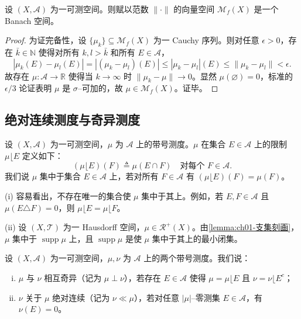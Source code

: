 \documentclass[../../main.tex]{subfiles}%
\begin{document}
\begin{proposition}\label{proposition:ch01-Banach完备}
设 $(X,\mathcal{A})$ 为一可测空间。则赋以范数 $\|\cdot\|$ 的向量空间 $\mathcal{M}_f(X)$ 是一个 Banach 空间。
\end{proposition}

\begin{proof}
为证完备性，设 $\{\mu_k\}\subseteq\mathcal{M}_f(X)$ 为一 Cauchy 序列。则对任意 $\epsilon>0$，存在 $\bar{k}\in\mathbb{N}$ 使得对所有 $k,l>\bar{k}$ 和所有 $E\in\mathcal{A}$，
\[
|\mu_k(E)-\mu_l(E)|=|(\mu_k-\mu_l)(E)|\leqslant|\mu_k-\mu_l|(E)\leqslant\|\mu_k-\mu_l\|<\epsilon.
\]
故存在 $\mu:\mathcal{A}\to\mathbb{R}$ 使得当 $k\to\infty$ 时 $\|\mu_k-\mu\|\to 0$。显然 $\mu(\varnothing )=0$，标准的 $\epsilon/3$ 论证表明 $\mu$ 是 $\sigma$--可加的，故 $\mu\in\mathcal{M}_f(X)$。证毕。
\end{proof}

\subsection{绝对连续测度与奇异测度}\label{subsection:ch01-绝对连续奇异}

\begin{definition}\label{definition:ch01-集中测度}
设 $(X,\mathcal{A})$ 为一可测空间，$\mu$ 为 $\mathcal{A}$ 上的带号测度。$\mu$ 在集合 $E\in\mathcal{A}$ 上的限制 $\mu\lfloor E$ 定义如下：
\[
(\mu\lfloor E)(F)\triangleq \mu(E\cap F)\quad\text{对每个 }F\in\mathcal{A}.
\]
我们说 $\mu$ 集中于集合 $E\in\mathcal{A}$ 上，若对所有 $F\in\mathcal{A}$ 有 $(\mu\lfloor E)(F)=\mu(F)$。
\end{definition}

\begin{remark}\label{remark:ch01-集中注记}
(i) 容易看出，不存在唯一的集合使 $\mu$ 集中于其上。例如，若 $E,F\in\mathcal{A}$ 且 $\mu(E\triangle F)=0$，则 $\mu\lfloor E=\mu\lfloor F$。

(ii) 设 $(X,\mathcal{T})$ 为一 Hausdorff 空间，$\mu\in\mathcal{R}^+(X)$。由\cref{lemma:ch01-支集刻画}，$\mu$ 集中于 $\operatorname{supp}\mu$ 上，且 $\operatorname{supp}\mu$ 是使 $\mu$ 集中于其上的最小闭集。
\end{remark}

\begin{definition}\label{definition:ch01-相互奇异绝对连续}\label{definition:ch01-测度绝对连续}
设 $(X,\mathcal{A})$ 为一可测空间，$\mu,\nu$ 为 $\mathcal{A}$ 上的两个带号测度。我们说：
\begin{enumerate}[(i)]
\item $\mu$ 与 $\nu$ 相互奇异（记为 $\mu\perp\nu$），若存在 $E\in\mathcal{A}$ 使得 $\mu=\mu\lfloor E$ 且 $\nu=\nu\lfloor E^c$；
\item $\nu$ 关于 $\mu$ 绝对连续（记为 $\nu\ll\mu$），若对任意 $|\mu|$--零测集 $E\in\mathcal{A}$，有 $\nu(E)=0$。
\end{enumerate}
\end{definition}
\end{document}
